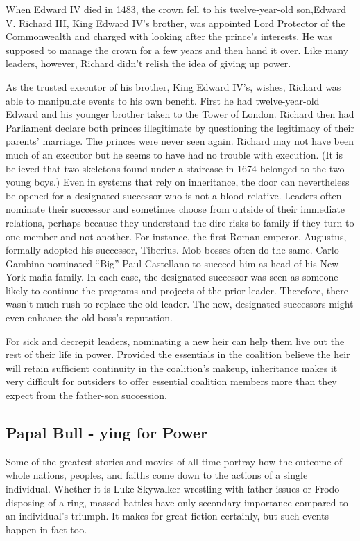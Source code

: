 \documentclass[10pt]{article}
\begin{document}
{\large When Edward IV died in 1483, the crown fell to his twelve-year-old
son,Edward V. Richard III, King Edward IV's brother, was appointed Lord Protector
of the Commonwealth and charged with looking after the prince's interests. He was
supposed to manage the crown for a few years and then hand it over. Like many
leaders, however, Richard didn't relish the idea of giving up power.}

{\large As the trusted executor of his brother, King Edward IV's, wishes,
Richard was able to manipulate events to his own benefit. First he had
twelve-year-old Edward and his younger brother taken to the Tower of London.
Richard then had Parliament declare both princes illegitimate by questioning the
legitimacy of their parents' marriage. The princes were never seen again. Richard
may not have been much of an executor but he seems to have had no trouble with
execution. (It is believed that two skeletons found under a staircase in 1674
belonged to the two young boys.) Even in systems that rely on inheritance, the
door can nevertheless be opened for a designated successor who is not a blood
relative. Leaders often nominate their successor and sometimes choose from
outside of their immediate relations, perhaps because they understand the dire
risks to family if they turn to one member and not another. For instance, the
first Roman emperor, Augustus, formally adopted his successor, Tiberius. Mob
bosses often do the same. Carlo Gambino nominated ``Big'' Paul Castellano to
succeed him as head of his New York mafia family. In each case, the designated
successor was seen as someone likely to continue the programs and projects of the
prior leader. Therefore, there wasn't much rush to replace the old leader. The
new, designated successors might even enhance the old boss's reputation.}

{\large For sick and decrepit leaders, nominating a new heir can help them live
out the rest of their life in power. Provided the essentials in the coalition
believe the heir will retain sufficient continuity in the coalition's makeup,
inheritance makes it very difficult for outsiders to offer essential coalition
members more than they expect from the father-son succession.}

\subsection{Papal Bull - ying for Power}

{\large Some of the greatest stories and movies of all time portray how the
outcome of whole nations, peoples, and faiths come down to the actions of a
single individual. Whether it is Luke Skywalker wrestling with father issues or
Frodo disposing of a ring, massed battles have only secondary importance compared
to an individual's triumph. It makes for great fiction certainly, but such events
happen in fact too.}
\end{document}

